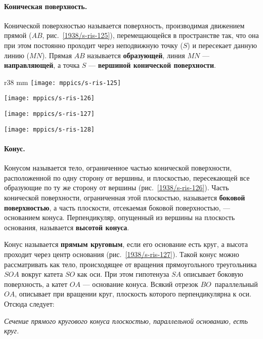 \paragraph{Коническая поверхность.}\label{1938/s108}
Конической поверхностью называется поверхность, производимая движением прямой ($AB$, рис.~\ref{1938/s-ris-125}), перемещающейся в пространстве так, что она при этом постоянно проходит через неподвижную точку ($S$) и пересекает данную линию ($MN$).
Прямая $AB$ называется \textbf{образующей}, линия $MN$ — \textbf{направляющей}, а точка $S$ — \textbf{вершиной конической поверхности}.

\begin{wrapfigure}{r}{38 mm}
\vskip-0mm
\centering
\texttt{[image: mppics/s-ris-125]}
\caption{}\label{1938/s-ris-125}
\bigskip
\texttt{[image: mppics/s-ris-126]}
\caption{}\label{1938/s-ris-126}
\bigskip
\texttt{[image: mppics/s-ris-127]}
\caption{}\label{1938/s-ris-127}
\bigskip
\texttt{[image: mppics/s-ris-128]}
\caption{}\label{1938/s-ris-128}
\vskip-0mm
\end{wrapfigure}

\paragraph{Конус.}\label{1938/s109}
Конусом называется тело, ограниченное частью конической поверхности, расположенной по одну сторону от вершины, и плоскостью, пересекающей все образующие по ту же сторону от вершины (рис.~\ref{1938/s-ris-126}).
Часть конической поверхности, ограниченная этой плоскостью, называется \textbf{боковой поверхностью}, а часть плоскости, отсекаемая боковой поверхностью, — основанием конуса.
Перпендикуляр, опущенный из вершины на плоскость основания, называется \textbf{высотой конуса}.

Конус называется \textbf{прямым круговым}, если его основание есть круг, а высота проходит через центр основания (рис.~\ref{1938/s-ris-127}).
Такой конус можно рассматривать как тело, происходящее от вращения прямоугольного треугольника $SOA$ вокруг катета $SO$ как оси.
При этом гипотенуза $SA$ описывает боковую поверхность, а катет $OA$ — основание конуса.
Всякий отрезок $BO$\, параллельный $OA$, описывает при вращении круг, плоскость которого перпендикулярна к оси.
Отсюда следует:

\emph{Сечение прямого кругового конуса плоскостью, параллельной основанию, есть круг.}

